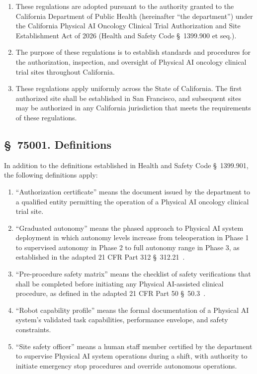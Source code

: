 \documentclass[11pt,letterpaper]{article}
\begin{document}
\begin{enumerate}[label=(\alph*)]
\item These regulations are adopted pursuant to the authority granted to the
  California Department of Public Health (hereinafter ``the department'') under
  the California Physical AI Oncology Clinical Trial Authorization and Site
  Establishment Act of 2026 (Health and Safety Code \S~1399.900 et seq.).

\item The purpose of these regulations is to establish standards and procedures
  for the authorization, inspection, and oversight of Physical AI oncology
  clinical trial sites throughout California.

\item These regulations apply uniformly across the State of California. The
  first authorized site shall be established in San Francisco, and subsequent
  sites may be authorized in any California jurisdiction that meets the
  requirements of these regulations.
\end{enumerate}

\subsection{\S~75001. Definitions}

In addition to the definitions established in Health and Safety Code
\S~1399.901, the following definitions apply:

\begin{enumerate}[label=(\alph*)]
\item ``Authorization certificate'' means the document issued by the department
  to a qualified entity permitting the operation of a Physical AI oncology
  clinical trial site.

\item ``Graduated autonomy'' means the phased approach to Physical AI system
  deployment in which autonomy levels increase from teleoperation in Phase 1
  to supervised autonomy in Phase 2 to full autonomy range in Phase 3, as
  established in the adapted 21 CFR Part 312 \S~312.21~\cite{cfr312adapt}.

\item ``Pre-procedure safety matrix'' means the checklist of safety
  verifications that shall be completed before initiating any Physical
  AI-assisted clinical procedure, as defined in the adapted 21 CFR Part 50
  \S~50.3~\cite{cfr50adapt}.

\item ``Robot capability profile'' means the formal documentation of a Physical
  AI system's validated task capabilities, performance envelope, and safety
  constraints.

\item ``Site safety officer'' means a human staff member certified by the
  department to supervise Physical AI system operations during a shift, with
  authority to initiate emergency stop procedures and override autonomous
  operations.
\end{enumerate}
\end{document}
